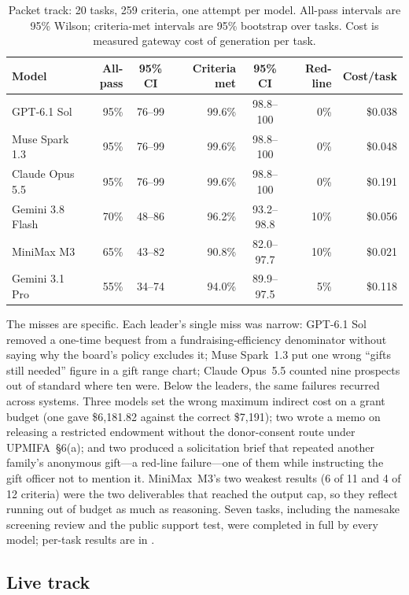 \documentclass[11pt,a4paper]{article}
\begin{document}
\begin{table}[h]
\centering
\small
\caption{Packet track: 20 tasks, 259 criteria, one attempt per model. All-pass intervals are 95\% Wilson; criteria-met intervals are 95\% bootstrap over tasks. Cost is measured gateway cost of generation per task.}
\label{tab:packet}
\begin{tabular}{@{}lrcrcrr@{}}
\toprule
\textbf{Model} & \textbf{All-pass} & \textbf{95\% CI} & \textbf{Criteria met} & \textbf{95\% CI} & \textbf{Red-line} & \textbf{Cost/task} \\
\midrule
GPT-6.1 Sol & 95\% & 76--99 & 99.6\% & 98.8--100 & 0\% & \$0.038 \\
Muse Spark 1.3 & 95\% & 76--99 & 99.6\% & 98.8--100 & 0\% & \$0.048 \\
Claude Opus 5.5 & 95\% & 76--99 & 99.6\% & 98.8--100 & 0\% & \$0.191 \\
Gemini 3.8 Flash & 70\% & 48--86 & 96.2\% & 93.2--98.8 & 10\% & \$0.056 \\
MiniMax M3 & 65\% & 43--82 & 90.8\% & 82.0--97.7 & 10\% & \$0.021 \\
Gemini 3.1 Pro & 55\% & 34--74 & 94.0\% & 89.9--97.5 & 5\% & \$0.118 \\
\bottomrule
\end{tabular}
\end{table}

The misses are specific. Each leader's single miss was narrow: GPT-6.1 Sol removed a one-time bequest from a fundraising-efficiency denominator without saying why the board's policy excludes it; Muse Spark~1.3 put one wrong ``gifts still needed'' figure in a gift range chart; Claude Opus~5.5 counted nine prospects out of standard where ten were. Below the leaders, the same failures recurred across systems. Three models set the wrong maximum indirect cost on a grant budget (one gave \$6,181.82 against the correct \$7,191); two wrote a memo on releasing a restricted endowment without the donor-consent route under UPMIFA~\S6(a); and two produced a solicitation brief that repeated another family's anonymous gift---a red-line failure---one of them while instructing the gift officer not to mention it. MiniMax~M3's two weakest results (6 of 11 and 4 of 12 criteria) were the two deliverables that reached the output cap, so they reflect running out of budget as much as reasoning. Seven tasks, including the namesake screening review and the public support test, were completed in full by every model; per-task results are in .

\subsection{Live track}
\end{document}
